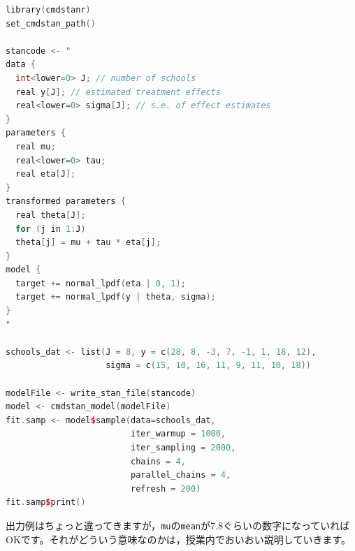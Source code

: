 \documentclass{ltjsbook}
\begin{document}
\begin{lstlisting}[language=c++,label={code::App1},caption={cmdstanrパッケージの起動確認}]
library(cmdstanr)
set_cmdstan_path()

stancode <- "
data {
  int<lower=0> J; // number of schools 
  real y[J]; // estimated treatment effects
  real<lower=0> sigma[J]; // s.e. of effect estimates 
}
parameters {
  real mu; 
  real<lower=0> tau;
  real eta[J];
}
transformed parameters {
  real theta[J];
  for (j in 1:J)
  theta[j] = mu + tau * eta[j];
}
model {
  target += normal_lpdf(eta | 0, 1);
  target += normal_lpdf(y | theta, sigma);
}
"

schools_dat <- list(J = 8, y = c(28, 8, -3, 7, -1, 1, 18, 12), 
                    sigma = c(15, 10, 16, 11, 9, 11, 10, 18))

modelFile <- write_stan_file(stancode)
model <- cmdstan_model(modelFile)
fit.samp <- model$sample(data=schools_dat,
                         iter_warmup = 1000,
                         iter_sampling = 2000,
                         chains = 4,
                         parallel_chains = 4,
                         refresh = 200)
fit.samp$print()
\end{lstlisting}

出力例はちょっと違ってきますが，\texttt{mu}の\texttt{mean}が7.8ぐらいの数字になっていればOKです。それがどういう意味なのかは，授業内でおいおい説明していきます。
\end{document}

